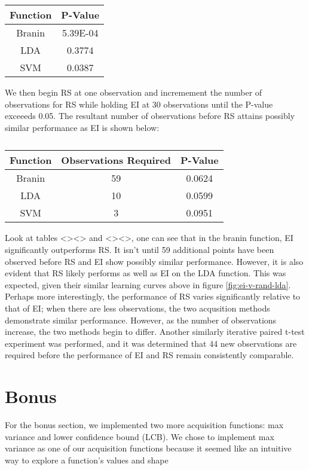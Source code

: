 \documentclass[11pt]{article}
\numberwithin{equation}{section}
\begin{document}
\begin{table}[H]
  \centering
  \begin{tabular}{| c | c |}
    \hline
    Function & P-Value  \\
    \hline
    Branin   & 5.39E-04 \\
    \hline
    LDA      & 0.3774   \\
    \hline
    SVM      & 0.0387   \\
    \hline
  \end{tabular}
  \caption{}
  \label{tab:ei-rs-p}
\end{table}

We then begin RS at one observation and incremement the number of observations for RS while holding EI at 30 observations until the P-value exceeeds 0.05.
The resultant number of observations before RS attains possibly similar performance as EI is shown below:

\begin{table}[H]
  \centering
  \begin{tabular}{| c | c | c |}
    \hline
    Function & Observations Required & P-Value \\
    \hline
    Branin & 59 & 0.0624 \\
    \hline
    LDA & 10 & 0.0599 \\
    \hline
    SVM & 3 & 0.0951 \\
    \hline
  \end{tabular}
  \caption{}
  \label{}
\end{table}

Look at tables <><> and <><>, one can see that in the branin function, EI significantly outperforms RS. 
It isn't until 59 additional points have been observed before RS and EI show possibly similar performance.
However, it is also evident that RS likely performs as well as EI on the LDA function. This was expected, given their similar learning curves above in figure \ref{fig:ei-v-rand-lda}.
Perhaps more interestingly, the performance of RS varies significantly relative to that of EI; when there are less observations, the two acqusition methods demonstrate similar performance. 
However, as the number of observations increase, the two methods begin to differ. 
Another similarly iterative paired t-test experiment was performed, and it was determined that 44 new observations are required before the performance of EI and RS remain consistently comparable.

\section*{Bonus}
For the bonus section, we implemented two more acquisition functions: max variance and lower confidence bound (LCB). We chose to implement max variance as one of our acquisition functions because it seemed like an intuitive way to explore a function's values and shape
\end{document}
